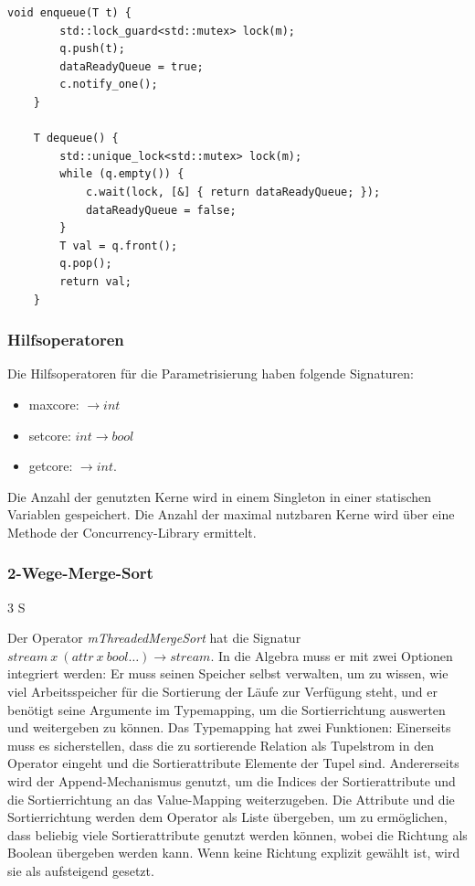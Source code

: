 \documentclass[a4paper,12pt,twoside]{article}
\newcommand{\Fb}[1]{\textit{#1}} %
\begin{document}
\begin{minipage}{\linewidth}
	\begin{lstlisting}[caption={Enqueue und Dequeue-Methode der threadsichere Warteschlange}, label=list:queue]
	void enqueue(T t) {
		std::lock_guard<std::mutex> lock(m);
		q.push(t);
		dataReadyQueue = true;
		c.notify_one();
	}
	
	T dequeue() {
		std::unique_lock<std::mutex> lock(m);
		while (q.empty()) {
			c.wait(lock, [&] { return dataReadyQueue; });
			dataReadyQueue = false;
		}
		T val = q.front();
		q.pop();
		return val;
	}
	\end{lstlisting}
\end{minipage}

\subsubsection{Hilfsoperatoren}

Die Hilfsoperatoren für die Parametrisierung haben folgende Signaturen:

\begin{itemize}
	\item maxcore: $\longrightarrow int$
	\item setcore: $int \longrightarrow bool$
	\item getcore: $\longrightarrow int$.
\end{itemize}

Die Anzahl der genutzten Kerne wird in einem Singleton in einer statischen Variablen gespeichert. Die Anzahl der maximal nutzbaren Kerne wird über eine Methode der Concurrency-Library ermittelt.

\subsubsection{2-Wege-Merge-Sort} 3 S

Der Operator \Fb{mThreadedMergeSort} hat die Signatur $stream~x~(attr~x~bool \ldots) \longrightarrow stream$. In die Algebra muss er mit zwei Optionen integriert werden: Er muss seinen Speicher selbst verwalten, um zu wissen, wie viel Arbeitsspeicher für die Sortierung der Läufe zur Verfügung steht, und er benötigt seine Argumente im Typemapping, um die Sortierrichtung auswerten und weitergeben zu können. Das Typemapping hat zwei Funktionen: Einerseits muss es sicherstellen, dass die zu sortierende Relation als Tupelstrom in den Operator eingeht und die Sortierattribute Elemente der Tupel sind. Andererseits wird der Append-Mechanismus genutzt, um die Indices der Sortierattribute und die Sortierrichtung an das Value-Mapping weiterzugeben. Die Attribute und die Sortierrichtung werden dem Operator als Liste übergeben, um zu ermöglichen, dass beliebig viele Sortierattribute genutzt werden können, wobei die Richtung als Boolean übergeben werden kann. Wenn keine Richtung explizit gewählt ist, wird sie als aufsteigend gesetzt.
\end{document}
